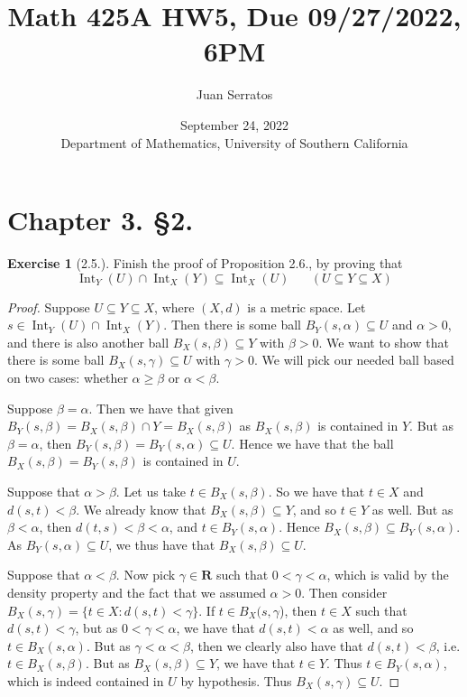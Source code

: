 \documentclass[10pt,reqno]{amsart}
\title{Math 425A HW5, Due 09/27/2022, 6PM}
\author{Juan Serratos}
\date{ September 24, 2022 \\ {Department of Mathematics, University of Southern California}}
\theoremstyle{definition}
\newtheorem{exercise}{Exercise}[section]
\DeclareMathOperator{\Int}{Int}
\newcommand{\rr}{\mathbf R}
\begin{document}
\maketitle
\setcounter{tocdepth}{4}
\setcounter{secnumdepth}{4}

\section*{Chapter 3. \S 2.}
\begin{exercise}[2.5.] Finish the proof of Proposition 2.6., by proving that 
\[
\Int_Y (U) \cap \Int_X (Y) \subseteq \Int_X (U) \; \; \; \; \; \; (U \subseteq Y \subseteq X)
\]
\end{exercise}
\begin{proof}
	Suppose $U \subseteq Y \subseteq X$, where $(X,d)$ is a metric space. Let $s \in \Int _Y (U) \cap \Int_X(Y)$. Then there is some ball $B_Y(s, \alpha) \subseteq U$ and $\alpha >0$, and there is also another ball $B_X(s, \beta) \subseteq Y$ with $\beta > 0$. We want to show that there is some ball $B_X( s,\gamma) \subseteq U$ with $\gamma >0$. We will pick our needed ball based on two cases: whether $\alpha \geq \beta$ or $\alpha < \beta$. 
	
	Suppose $\beta = \alpha$. Then we have that given $B_Y(s, \beta) = B_X(s, \beta) \cap Y = B_X(s,\beta)$ as $B_X(s, \beta)$ is contained in $Y$. But as $\beta = \alpha$, then $B_Y(s, \beta) = B_Y(s, \alpha) \subseteq U$. Hence we have that the ball $B_X(s, \beta) = B_Y(s, \beta)$ is contained in $U$.
	
	Suppose that $\alpha > \beta$. Let us take $t \in B_X(s, \beta)$. So we have that $t \in X$ and $d(s,t) < \beta$.  We already know that $B_X(s, \beta) \subseteq Y$, and so $t \in Y$ as well. But as $\beta < \alpha$, then $d(t,s) < \beta < \alpha$, and $t \in B_Y(s, \alpha )$. Hence $B_X(s, \beta) \subseteq B_Y (s, \alpha)$. As $B_Y(s, \alpha) \subseteq U$, we thus have that $B_X(s, \beta) \subseteq U$.
	
	Suppose that $\alpha < \beta$. Now pick $\gamma \in \rr$ such that $0<\gamma < \alpha$, which is valid by the density property and the fact that we assumed $\alpha >0$. Then consider $B_X(s, \gamma) = \{t \in X \colon d(s,t) < \gamma \}$. If $t \in B_X(s, \gamma$), then $t \in X$ such that $d(s,t) < \gamma$, but as $0 < \gamma < \alpha$, we have that $d(s,t) < \alpha$ as well, and so $t \in B_X(s, \alpha)$. But as $\gamma < \alpha < \beta$, then we clearly also have that $d(s,t) < \beta$, i.e. $t \in B_X(s, \beta)$. But as $B_X(s, \beta) \subseteq Y$, we have that $t \in Y$. Thus $t \in B_Y(s, \alpha)$, which is indeed contained in $U$ by hypothesis. Thus $B_X(s, \gamma) \subseteq U$.
\end{proof}
\end{document}
